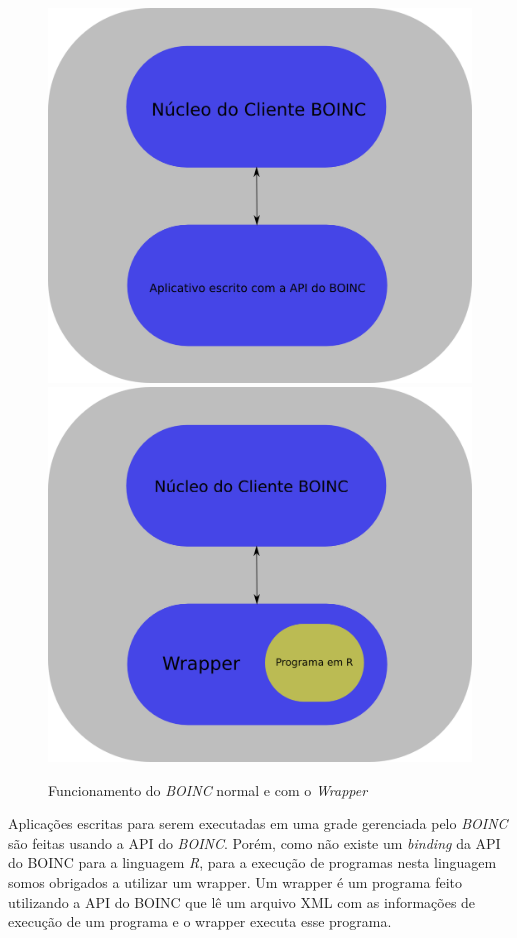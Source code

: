 \documentclass[b1,portrait]{sciposter}
\begin{document}
\begin{multicols}{2}
\begin{figure}[!h]
  \centering
  \includegraphics[scale=0.3]{boinc-diagram-normal.png}
  \includegraphics[scale=0.3]{boinc-diagram-wrapper.png}
  \caption{Funcionamento do \textit{BOINC} normal e com o \textit{Wrapper}}
  \label{boinc_funcionamento_nw}
\end{figure}


Aplicações escritas para serem executadas em uma grade gerenciada
pelo \textit{BOINC} são feitas usando a API do  \textit{BOINC}. Porém, como não existe
um \textit{binding} da API do BOINC para a linguagem \textit{R}, 
para a execução de programas nesta linguagem somos obrigados a utilizar
um wrapper. Um wrapper é um programa feito utilizando a API do BOINC
que lê um arquivo XML com as informações de execução de um programa
e o wrapper executa esse programa.  


\end{multicols}
\end{document}
